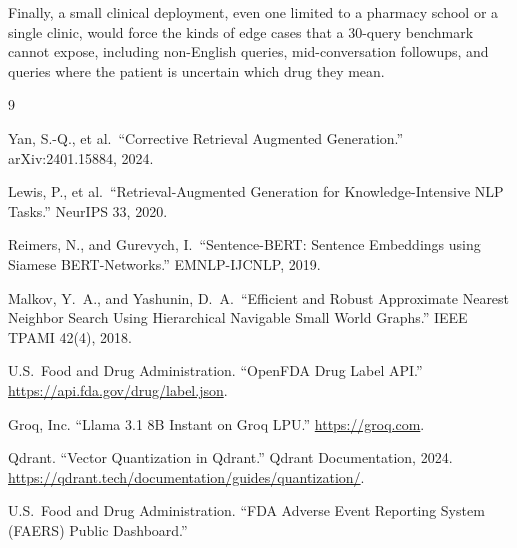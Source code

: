 \documentclass[12pt]{article}
\begin{document}
Finally, a small clinical deployment, even one limited to a pharmacy school or a single clinic, would force the kinds of edge cases that a 30-query benchmark cannot expose, including non-English queries, mid-conversation followups, and queries where the patient is uncertain which drug they mean.

\begin{thebibliography}{9}
\small\singlespacing

 Yan, S.-Q., et al.\ ``Corrective Retrieval Augmented Generation.'' arXiv:2401.15884, 2024.

 Lewis, P., et al.\ ``Retrieval-Augmented Generation for Knowledge-Intensive NLP Tasks.'' NeurIPS 33, 2020.

 Reimers, N., and Gurevych, I.\ ``Sentence-BERT: Sentence Embeddings using Siamese BERT-Networks.'' EMNLP-IJCNLP, 2019.

 Malkov, Y.~A., and Yashunin, D.~A.\ ``Efficient and Robust Approximate Nearest Neighbor Search Using Hierarchical Navigable Small World Graphs.'' IEEE TPAMI 42(4), 2018.

 U.S.\ Food and Drug Administration. ``OpenFDA Drug Label API.'' \url{https://api.fda.gov/drug/label.json}.

 Groq, Inc. ``Llama 3.1 8B Instant on Groq LPU.'' \url{https://groq.com}.

 Qdrant. ``Vector Quantization in Qdrant.'' Qdrant Documentation, 2024. \url{https://qdrant.tech/documentation/guides/quantization/}.

 U.S.\ Food and Drug Administration. ``FDA Adverse Event Reporting System (FAERS) Public Dashboard.''

\end{thebibliography}
\end{document}
